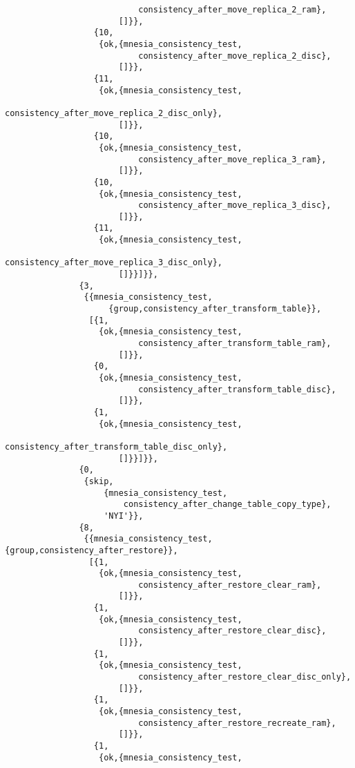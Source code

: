 \begin{verbatim}
                           consistency_after_move_replica_2_ram},
                       []}},
                  {10,
                   {ok,{mnesia_consistency_test,
                           consistency_after_move_replica_2_disc},
                       []}},
                  {11,
                   {ok,{mnesia_consistency_test,
                           consistency_after_move_replica_2_disc_only},
                       []}},
                  {10,
                   {ok,{mnesia_consistency_test,
                           consistency_after_move_replica_3_ram},
                       []}},
                  {10,
                   {ok,{mnesia_consistency_test,
                           consistency_after_move_replica_3_disc},
                       []}},
                  {11,
                   {ok,{mnesia_consistency_test,
                           consistency_after_move_replica_3_disc_only},
                       []}}]}},
               {3,
                {{mnesia_consistency_test,
                     {group,consistency_after_transform_table}},
                 [{1,
                   {ok,{mnesia_consistency_test,
                           consistency_after_transform_table_ram},
                       []}},
                  {0,
                   {ok,{mnesia_consistency_test,
                           consistency_after_transform_table_disc},
                       []}},
                  {1,
                   {ok,{mnesia_consistency_test,
                           consistency_after_transform_table_disc_only},
                       []}}]}},
               {0,
                {skip,
                    {mnesia_consistency_test,
                        consistency_after_change_table_copy_type},
                    'NYI'}},
               {8,
                {{mnesia_consistency_test,{group,consistency_after_restore}},
                 [{1,
                   {ok,{mnesia_consistency_test,
                           consistency_after_restore_clear_ram},
                       []}},
                  {1,
                   {ok,{mnesia_consistency_test,
                           consistency_after_restore_clear_disc},
                       []}},
                  {1,
                   {ok,{mnesia_consistency_test,
                           consistency_after_restore_clear_disc_only},
                       []}},
                  {1,
                   {ok,{mnesia_consistency_test,
                           consistency_after_restore_recreate_ram},
                       []}},
                  {1,
                   {ok,{mnesia_consistency_test,

\end{verbatim}
